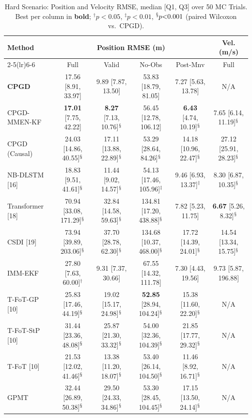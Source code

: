 \begin{table}[htbp]\centering
\caption{Hard Scenario: Position and Velocity RMSE, median [Q1, Q3] over 50 MC Trials. Best per column in \textbf{bold}; $^{\dagger}p{<}0.05$, $^{\ddagger}p{<}0.01$, $^{\mathsection}p{<}0.001$ (paired Wilcoxon vs.\ CPGD).}
\label{tab:hard_results}
\setlength{\tabcolsep}{4pt}
\centering\small\begin{tabular}{lccccc}
\toprule
\multirow{2}{*}{Method} & \multicolumn{4}{c}{Position RMSE (m)} & Vel. (m/s) \\
\cmidrule(lr){2-5}\cmidrule(lr){6-6}
& Full & Valid & No-Obs & Post-Mnv & Full \\
\midrule
\textbf{CPGD} & 17.56 [8.91, 33.97] & 9.89 [7.87, 13.50] & 53.83 [18.79, 81.05] & 7.27 [5.63, 13.78] & N/A \\
CPGD-MMEN-KF & \textbf{17.01} [7.75, 42.22] & \textbf{8.27} [7.13, 10.76]$^{\mathsection}$ & 56.45 [12.78, 106.12] & \textbf{6.43} [4.74, 10.19]$^{\mathsection}$ & 7.65 [6.14, 11.19]$^{\mathsection}$ \\
CPGD (Causal) & 24.03 [14.86, 40.55]$^{\mathsection}$ & 17.11 [13.88, 22.89]$^{\mathsection}$ & 53.29 [28.64, 84.26]$^{\mathsection}$ & 14.18 [10.96, 22.47]$^{\mathsection}$ & 27.12 [25.91, 28.23]$^{\mathsection}$ \\
NB-DLSTM [16] & 18.83 [9.51, 41.61]$^{\mathsection}$ & 11.44 [9.02, 14.57]$^{\mathsection}$ & 54.13 [17.46, 105.96]$^{\ddagger}$ & 9.46 [6.93, 13.37]$^{\ddagger}$ & 8.30 [6.87, 10.35]$^{\mathsection}$ \\
Transformer [18] & 70.94 [33.08, 171.29]$^{\mathsection}$ & 32.84 [14.58, 59.63]$^{\mathsection}$ & 134.81 [17.20, 438.88]$^{\mathsection}$ & 7.82 [5.23, 11.75] & \textbf{6.67} [5.26, 8.32]$^{\mathsection}$ \\
CSDI [19] & 73.94 [39.89, 203.06]$^{\mathsection}$ & 37.70 [28.78, 62.30]$^{\mathsection}$ & 134.68 [10.37, 468.00]$^{\mathsection}$ & 17.72 [14.39, 24.01]$^{\mathsection}$ & 14.54 [13.34, 15.75]$^{\mathsection}$ \\
IMM-EKF & 27.80 [7.63, 60.00]$^{\dagger}$ & 9.31 [7.37, 30.66] & 67.55 [14.32, 111.78] & 7.30 [4.43, 19.56] & 9.73 [5.87, 196.88] \\
T-FoT-GP [10] & 25.83 [17.46, 44.19]$^{\mathsection}$ & 19.02 [15.17, 24.98]$^{\mathsection}$ & \textbf{52.85} [28.94, 104.24]$^{\mathsection}$ & 15.38 [11.60, 22.20]$^{\mathsection}$ & N/A \\
T-FoT-StP [10] & 31.44 [23.36, 48.08]$^{\mathsection}$ & 25.87 [21.30, 33.32]$^{\mathsection}$ & 54.00 [32.36, 104.39]$^{\mathsection}$ & 21.85 [17.77, 29.32]$^{\mathsection}$ & N/A \\
T-FoT [10] & 21.53 [12.02, 41.46]$^{\mathsection}$ & 13.38 [11.20, 18.07]$^{\mathsection}$ & 53.40 [26.14, 104.50]$^{\mathsection}$ & 11.46 [8.92, 16.71]$^{\mathsection}$ & N/A \\
GPMT & 32.44 [26.89, 50.38]$^{\mathsection}$ & 29.50 [24.33, 34.86]$^{\mathsection}$ & 53.30 [28.45, 104.45]$^{\mathsection}$ & 17.15 [13.50, 24.14]$^{\mathsection}$ & N/A \\
\bottomrule
\end{tabular}
\end{table}
